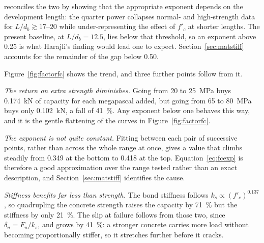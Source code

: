 \textcite{harajliComparisonBondStrength2004} reconciles the two by showing
that the appropriate exponent depends on the development length: the quarter
power collapses normal- and high-strength data for $L/d_b \gtrsim 17$--$20$
while under-representing the effect of $f'_c$ at shorter lengths. The
present baseline, at $L/d_b = 12.5$, lies below that threshold, so an
exponent above \num{0.25} is what Harajli's finding would lead one to
expect. Section~\ref{sec:matstiff} accounts for the remainder of the gap
below \num{0.50}.
 
Figure~\ref{fig:factorfc} shows the trend, and three further points follow
from it.
 
\emph{The return on extra strength diminishes.} Going from \SI{20}{} to
\SI{25}{\mega\pascal} buys \SI{0.174}{\kilo\newton} of capacity for each
megapascal added, but going from \SI{65}{} to \SI{80}{\mega\pascal} buys
only \SI{0.102}{\kilo\newton}, a fall of \SI{41}{\percent}. Any exponent
below one behaves this way, and it is the gentle flattening of the curves
in Figure~\ref{fig:factorfc}.

\emph{The exponent is not quite constant.} Fitting between each pair of
successive points, rather than across the whole range at once, gives a
value that climbs steadily from \num{0.349} at the bottom to \num{0.418}
at the top. Equation~\eqref{eq:fcexp} is therefore a good approximation
over the range tested rather than an exact description, and
Section~\ref{sec:matstiff} identifies the cause.

\emph{Stiffness benefits far less than strength.} The bond stiffness
follows $k_s \propto (f'_c)^{0.137}$, so quadrupling the concrete strength
raises the capacity by \SI{71}{\percent} but the stiffness by only
\SI{21}{\percent}. The slip at failure follows from those two, since
$\delta_u = F_u/k_s$, and grows by \SI{41}{\percent}: a stronger concrete
carries more load without becoming proportionally stiffer, so it stretches
further before it cracks.

